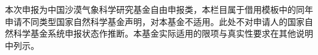 \justifying
\NSFCBodyText

本次申报为中国沙漠气象科学研究基金自由申报类，本栏目属于借用模板中的同年申请不同类型国家自然科学基金声明，对本基金不适用。此处不对申请人的国家自然科学基金系统申报状态作推断。本基金实际适用的限项与真实性要求在其他说明中列示。
